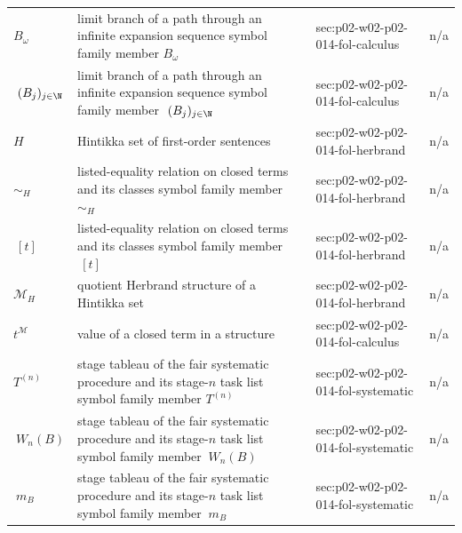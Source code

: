\begin{longtable}{@{}p{}p{}p{}p{}@{}}
\(B_\omega\) & limit branch of a path through an infinite expansion sequence symbol family member \(B_\omega\) & sec:\allowbreak{}p02-\allowbreak{}w02-\allowbreak{}p02-\allowbreak{}014-\allowbreak{}fol-\allowbreak{}calculus & n/a \\
\(\ (B_j)_{j\in\N}\) & limit branch of a path through an infinite expansion sequence symbol family member \(\ (B_j)_{j\in\N}\) & sec:\allowbreak{}p02-\allowbreak{}w02-\allowbreak{}p02-\allowbreak{}014-\allowbreak{}fol-\allowbreak{}calculus & n/a \\
\(H\) & Hintikka set of first-order sentences & sec:\allowbreak{}p02-\allowbreak{}w02-\allowbreak{}p02-\allowbreak{}014-\allowbreak{}fol-\allowbreak{}herbrand & n/a \\
\(\sim_H\) & listed-equality relation on closed terms and its classes symbol family member \(\sim_H\) & sec:\allowbreak{}p02-\allowbreak{}w02-\allowbreak{}p02-\allowbreak{}014-\allowbreak{}fol-\allowbreak{}herbrand & n/a \\
\(\ [t]\) & listed-equality relation on closed terms and its classes symbol family member \(\ [t]\) & sec:\allowbreak{}p02-\allowbreak{}w02-\allowbreak{}p02-\allowbreak{}014-\allowbreak{}fol-\allowbreak{}herbrand & n/a \\
\(\mathcal M_H\) & quotient Herbrand structure of a Hintikka set & sec:\allowbreak{}p02-\allowbreak{}w02-\allowbreak{}p02-\allowbreak{}014-\allowbreak{}fol-\allowbreak{}herbrand & n/a \\
\(t^{\mathcal M}\) & value of a closed term in a structure & sec:\allowbreak{}p02-\allowbreak{}w02-\allowbreak{}p02-\allowbreak{}014-\allowbreak{}fol-\allowbreak{}calculus & n/a \\
\(T^{(n)}\) & stage tableau of the fair systematic procedure and its stage-\(n\) task list symbol family member \(T^{(n)}\) & sec:\allowbreak{}p02-\allowbreak{}w02-\allowbreak{}p02-\allowbreak{}014-\allowbreak{}fol-\allowbreak{}systematic & n/a \\
\(\ W_n(B)\) & stage tableau of the fair systematic procedure and its stage-\(n\) task list symbol family member \(\ W_n(B)\) & sec:\allowbreak{}p02-\allowbreak{}w02-\allowbreak{}p02-\allowbreak{}014-\allowbreak{}fol-\allowbreak{}systematic & n/a \\
\(\ m_B\) & stage tableau of the fair systematic procedure and its stage-\(n\) task list symbol family member \(\ m_B\) & sec:\allowbreak{}p02-\allowbreak{}w02-\allowbreak{}p02-\allowbreak{}014-\allowbreak{}fol-\allowbreak{}systematic & n/a \\

\end{longtable}
